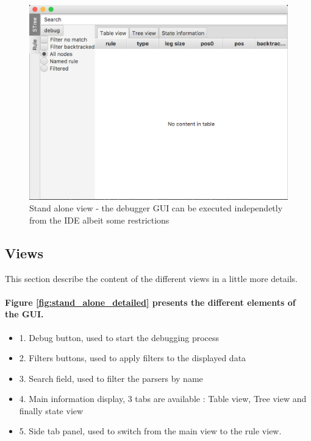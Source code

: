 	\begin{figure}[H]
		\centering
		\includegraphics[width=.75\textwidth] {ressources/stand_alone}
		\caption{Stand alone view - the debugger GUI can be executed independetly from the IDE albeit some restrictions} 
		\label{fig:stand_alone}
	\end{figure}

	\subsection{Views}
	This section describe the content of the different views in a little more details.

	\bigskip

	\paragraph{Figure \ref{fig:stand_alone_detailed} presents the different elements of the GUI.}
	\begin{itemize}
		\item 1. Debug button, used to start the debugging process
		\item 2. Filters buttons, used to apply filters to the displayed data
		\item 3. Search field, used to filter the parsers by name
		\item 4. Main information display, 3 tabs are available : Table view, Tree view and finally state view
		\item 5. Side tab panel, used to switch from the main view to the rule view.
	\end{itemize}

